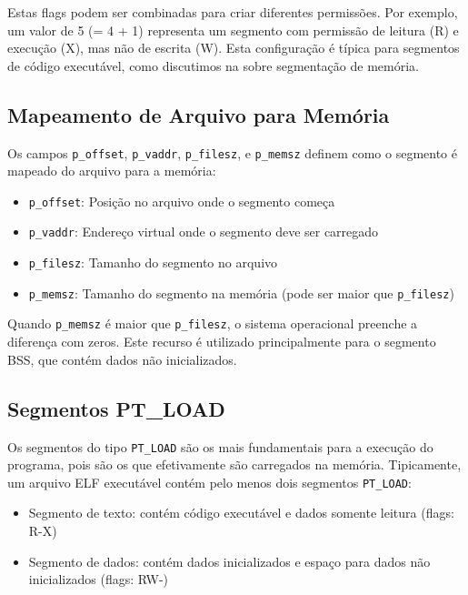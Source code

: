 Estas flags podem ser combinadas para criar diferentes permissões. Por exemplo, um valor de 5 (= 4 + 1) representa um segmento com permissão de leitura (R) e execução (X), mas não de escrita (W). Esta configuração é típica para segmentos de código executável, como discutimos na  sobre segmentação de memória.

\subsection{Mapeamento de Arquivo para Memória}\label{subsec:file_to_memory}

Os campos \texttt{p\_offset}, \texttt{p\_vaddr}, \texttt{p\_filesz}, e \texttt{p\_memsz} definem como o segmento é mapeado do arquivo para a memória:

\begin{itemize}
    \item \texttt{p\_offset}: Posição no arquivo onde o segmento começa
    \item \texttt{p\_vaddr}: Endereço virtual onde o segmento deve ser carregado
    \item \texttt{p\_filesz}: Tamanho do segmento no arquivo
    \item \texttt{p\_memsz}: Tamanho do segmento na memória (pode ser maior que \texttt{p\_filesz})
\end{itemize}

Quando \texttt{p\_memsz} é maior que \texttt{p\_filesz}, o sistema operacional preenche a diferença com zeros. Este recurso é utilizado principalmente para o segmento BSS, que contém dados não inicializados.

\subsection{Segmentos PT\_LOAD}\label{subsec:pt_load}

Os segmentos do tipo \texttt{PT\_LOAD} são os mais fundamentais para a execução do programa, pois são os que efetivamente são carregados na memória. Tipicamente, um arquivo ELF executável contém pelo menos dois segmentos \texttt{PT\_LOAD}:

\begin{itemize}
    \item Segmento de texto: contém código executável e dados somente leitura (flags: R-X)
    \item Segmento de dados: contém dados inicializados e espaço para dados não inicializados (flags: RW-)
\end{itemize}

